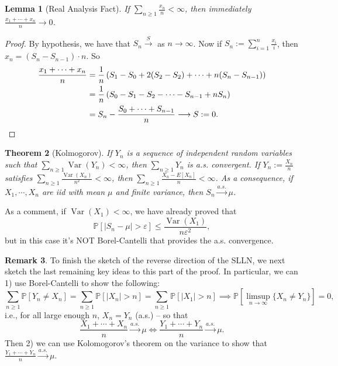 \documentclass[12pt,reqno]{article}
\theoremstyle{plain}
\newtheorem{theorem}{Theorem}[section]
\newtheorem{lemma}[theorem]{Lemma}
\theoremstyle{definition}
\newtheorem{remark}[theorem]{Remark}
\begin{document}
\begin{lemma}[Real Analysis Fact]
If $\sum_{n \geq 1} \frac{x_n}{n} < \infty$, then immediately 
$\frac{x_1+\cdots+x_n}{n} \rightarrow 0$. 
\end{lemma}
\begin{proof} 
By hypothesis, we have that $S_n \xrightarrow S$ as $n \rightarrow \infty$. 
Now if $S_n := \sum_{i=1}^n \frac{x_i}{i}$, then $x_n = (S_n-S_{n-1}) \cdot n$. 
So 
\begin{align*} 
\frac{x_1+\cdots+x_n}{n} & = \frac{1}{n}\left(S_1-S_0+2(S_2-S_2)+\cdots+n(S_n-S_{n-1})\right) \\ 
     & = \frac{1}{n}\left(S_0-S_1-S_2-\cdots-S_{n-1}+nS_n\right) \\ 
     & = S_n - \frac{S_0+\cdots+S_{n-1}}{n} \longrightarrow S := 0.
     \qedhere
\end{align*} 
\end{proof} 

\begin{theorem}[Kolmogorov]
If $Y_n$ is a sequence of independent random variables such that 
$\sum_{n \geq 1} \operatorname{Var}(Y_n) < \infty$, then 
$\sum_{n \geq 1} Y_n$ is a.s. convergent. 
If $Y_n := \frac{X_n}{n}$ satisfies 
$\sum_{n \geq 1} \frac{\operatorname{Var}(X_n)}{n^2} < \infty$, then 
$\sum_{n \geq 1} \frac{X_n - E[X_n]}{n} < \infty$. 
As a consequence, if $X_1,\cdots,X_n$ are iid with mean $\mu$ and finite 
variance, then $S_n \xrightarrow{a.s.} \mu$. 
\end{theorem} 

As a comment, if $\operatorname{Var}(X_1) < \infty$, we have already proved that 
\[
\mathbb{P}\left[|S_n - \mu| > \varepsilon\right] \leq 
     \frac{\operatorname{Var}(X_1)}{n \varepsilon^2}, 
\]
but in this case it's NOT Borel-Cantelli that provides the a.s. convergence. 

\begin{remark} 
To finish the sketch of the reverse direction of the SLLN, we next sketch the last 
remaining key ideas to this part of the proof. In particular, we can 1) use 
Borel-Cantelli to show the following: 
\[
\sum_{n \geq 1} \mathbb{P}[Y_n \neq X_n] = \sum_{n \geq 1} \mathbb{P}[|X_n| > n] = 
     \sum_{n \geq 1} \mathbb{P}[|X_1| > n] \implies 
     \mathbb{P}[\limsup_{n \rightarrow \infty} \{X_n \neq Y_n\}] = 0, 
\]
i.e., for all large enough $n$, $X_n = Y_n$ (a.s.) -- so that 
\[
\frac{X_1+\cdots+X_n}{n} \xrightarrow{a.s.} \mu \iff 
     \frac{Y_1+\cdots+Y_n}{n} \xrightarrow{a.s.} \mu.
\]
Then 2) we can use Kolomogorov's theorem on the variance to show that 
$\frac{Y_1+\cdots+Y_n}{n} \xrightarrow{a.s.} \mu$. 
\end{remark} 
\end{document}
